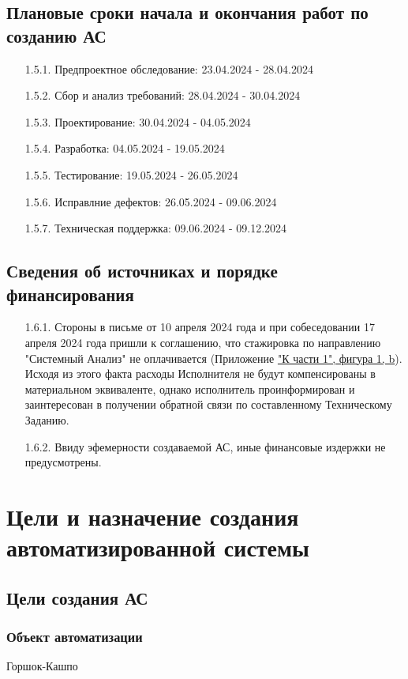 \documentclass[16pt,a4paper]{article}
\begin{document}
\subsection{Плановые сроки начала и окончания работ по созданию АС}
\begin{enumerate}
    \item [1.5.1.] Предпроектное обследование: 23.04.2024 - 28.04.2024
    \item [1.5.2.] Сбор и анализ требований: 28.04.2024 - 30.04.2024
    \item [1.5.3.] Проектирование: 30.04.2024 - 04.05.2024
    \item [1.5.4.] Разработка: 04.05.2024 - 19.05.2024
    \item [1.5.5.] Тестирование: 19.05.2024 - 26.05.2024
    \item [1.5.6.] Исправлние дефектов: 26.05.2024 - 09.06.2024
    \item [1.5.7.] Техническая поддержка: 09.06.2024 - 09.12.2024
\end{enumerate}
\subsection{Сведения об источниках и порядке финансирования}
\begin{enumerate}
    \item [1.6.1.] \label{sec:1.6.1.}Стороны в письме от 10 апреля 2024 года и при собеседовании 17 апреля 2024 года пришли к соглашению, что стажировка по направлению "Системный Анализ" не оплачивается (Приложение \hyperref[fig:second]{"К части 1", фигура 1, b}). Исходя из этого факта расходы Исполнителя не будут компенсированы в материальном эквиваленте, однако исполнитель проинформирован и заинтересован в получении обратной связи по составленному Техническому Заданию. 
    \item[1.6.2.] Ввиду эфемерности создаваемой АС, иные финансовые издержки не предусмотрены. 
\end{enumerate}

\section{Цели и назначение создания автоматизированной системы}
\subsection{Цели создания АС}
\label{sec:2.1.}
\subsubsection{Объект автоматизации}
Горшок-Кашпо
\end{document}
